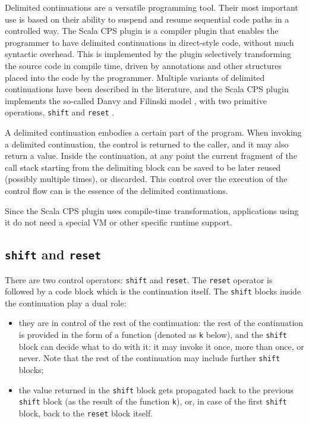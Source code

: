 Delimited continuations are a versatile programming tool. Their most important use is based on their ability to suspend and resume sequential code paths in a controlled way. The Scala CPS plugin is a compiler plugin that enables the programmer to have delimited continuations in direct-style code, without much syntactic overhead. This is implemented by the plugin selectively transforming the source code in compile time, driven by annotations and other structures placed into the code by the programmer. Multiple variants of delimited continuations have been described in the literature, and the Scala CPS plugin implements the so-called Danvy and Filinski model \cite{Danvy90abstractingcontrol}, with two primitive operations, \texttt{shift} and \texttt{reset} \cite{CPSTransform}. 

A delimited continuation embodies a certain part of the program. When invoking a delimited continuation, the control is returned to the caller, and it may also return a value. Inside the continuation, at any point the current fragment of the call stack starting from the delimiting block can be saved to be later reused (possibly multiple times), or discarded. This control over the execution of the control flow can is the essence of the delimited continuations.

Since the Scala CPS plugin uses compile-time transformation, applications using it do not need a special VM or other specific runtime support.

\subsection{\texttt{shift} and \texttt{reset}}

There are two control operators: \texttt{shift} and \texttt{reset}. The \texttt{reset} operator is followed by a code block which is the continuation itself. The \texttt{shift} blocks inside the continuation play a dual role: 
\begin{itemize}
\item they are in control of the rest of the continuation: the rest of the continuation is provided in the form of a function (denoted as \texttt{k} below), and the \texttt{shift} block can decide what to do with it: it may invoke it once, more than once, or never. Note that the rest of the continuation may include further \texttt{shift} blocks;
\item the value returned in the \texttt{shift} block gets propagated back to the previous \texttt{shift} block (as the result of the function \texttt{k}), or, in case of the first \texttt{shift} block, back to the \texttt{reset} block itself.
\end{itemize}

